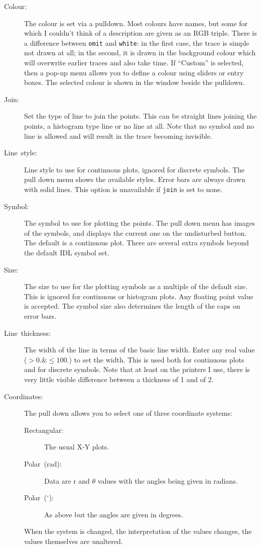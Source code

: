\documentclass[11pt,twoside,english]{article}
\begin{document}
\begin{description}
\item [Colour:]The colour is set via a pulldown. Most colours have
  names, but some for which I couldn't think of a description are given
  as an RGB triple. There is a difference between \texttt{omit} and
  \texttt{white}: in the first case, the trace is simple not drawn at
  all; in the second, it is drawn in the background colour which will
  overwrite earlier traces and also take time. If ``Custom'' is
  selected, then a pop-up menu allows you to define a colour using
  sliders or entry boxes.  The selected colour is shown in the
  window beside the pulldown.
\item [Join:]Set the type of line to join the points. This can be
  straight lines joining the points, a histogram type line or no line
  at all.  Note that no symbol and no line is allowed and will result
  in the trace becoming invisible.
\item [Line~style:]Line style to use for continuous plots, ignored for
  discrete symbols. The pull down menu shows the available
  styles. Error bars are always drawn with solid lines. This option is
  unavailable if \texttt{join} is set to none.
\item [Symbol:]The symbol to use for plotting the points. The pull down
  menu has images of the symbols, and displays the current one on the
  undisturbed button. The default is a continuous plot. There are 
  several extra symbols beyond the default IDL symbol set.
\item [Size:]The size to use for the plotting symbols as a multiple of
  the default size. This is ignored for continuous or histogram plots.
  Any floating point value is accepted. The symbol size also determines
  the length of the caps on error bars.
\item [Line~thickness:]The width of the line in terms of the basic line
  width. Enter any real value ($>0. \& \leq100.$) to set the width. This is used
  both for continuous plots and for discrete symbols. Note that at
  least on the printers I use, there is very little visible difference
  between a thickness of 1 and of 2.
\item [Coordinates:]The pull down allows you to select one of three
  coordinate systems:

  \begin{description}
  \item [Rectangular:]The usual X-Y plots.
  \item [Polar~(rad):]Data are $\mathrm{r}$ and $\theta$ values with
    the angles being given in radians.
  \item [Polar~($^{\circ}$):]As above but the angles are given in
    degrees.
  \end{description}
  When the system is changed, the interpretation of the values changes,
  the values themselves are unaltered.


\end{description}
\end{document}
